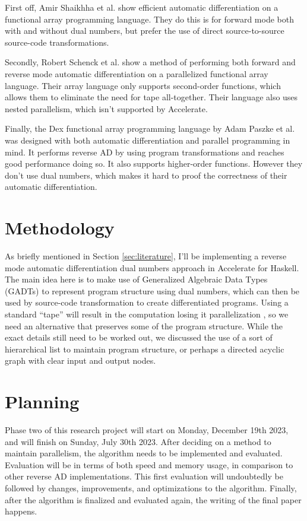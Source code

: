 \documentclass{article}
\begin{document}
                First off, Amir Shaikhha et al. \cite{shaikhha2019efficient} show efficient automatic differentiation on a functional array programming language.
                They do this is for forward mode both with and without dual numbers, but prefer the use of direct source-to-source source-code transformations.

                Secondly, Robert Schenck et al. \cite{schenck2022ad} show a method of performing both forward and reverse mode automatic differentiation on a parallelized functional array language.
                Their array language only supports second-order functions, which allows them to eliminate the need for tape all-together.
                Their language also uses nested parallelism, which isn't supported by Accelerate.

                Finally, the Dex functional array programming language by Adam Paszke et al. \cite{paszke2021getting} was designed with both automatic differentiation and parallel programming in mind.
                It performs reverse AD by using program transformations and reaches good performance doing so.
                It also supports higher-order functions.
                However they don't use dual numbers, which makes it hard to proof the correctness of their automatic differentiation.    

    \section{Methodology} \label{sec:methods}
        As briefly mentioned in Section \ref{sec:literature}, I'll be implementing a reverse mode automatic differentiation dual numbers approach in Accelerate for Haskell.
        The main idea here is to make use of Generalized Algebraic Data Types (GADTs) to represent program structure using dual numbers, which can then be used by source-code transformation to create differentiated programs.
        Using a standard ``tape'' will result in the computation losing it parallelization \cite{smeding2022efficient}, so we need an alternative that preserves some of the program structure.
        While the exact details still need to be worked out, we discussed the use of a sort of hierarchical list to maintain program structure, or perhaps a directed acyclic graph with clear input and output nodes.

    \section{Planning} \label{sec:planning}
        Phase two of this research project will start on Monday, December 19th 2023, and will finish on Sunday, July 30th 2023.
        After deciding on a method to maintain parallelism, the algorithm needs to be implemented and evaluated.
        Evaluation will be in terms of both speed and memory usage, in comparison to other reverse AD implementations.
        This first evaluation will undoubtedly be followed by changes, improvements, and optimizations to the algorithm.
        Finally, after the algorithm is finalized and evaluated again, the writing of the final paper happens.
        
\end{document}

